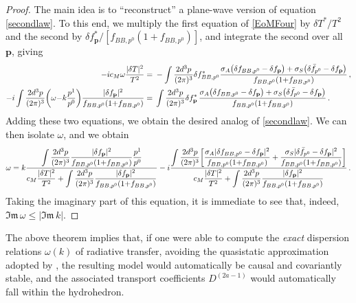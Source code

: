 \documentclass[a4paper, amsfonts, amssymb, amsmath, reprint, showkeys, nofootinbib, twoside,notitlepage,onecolumn]{revtex4-2}
\theoremstyle{definition}
\theoremstyle{theorem}
\theoremstyle{corollary}
\begin{document}
\begin{proof}
The main idea is to ``reconstruct'' a plane-wave version of equation \eqref{secondlaw}. To this end, we multiply the first equation of \eqref{EoMFour} by $\delta T^*/T^2$ and the second by $\delta f_\mathbf{p}^*/[f_{BB,p^0}(1{+}f_{BB,p^0})]$, and integrate the second over all $\mathbf{p}$, giving
\begin{equation}\label{Emu2}
\begin{split}
-i c_M \omega \dfrac{|\delta T|^2}{T^2} ={}& -\int \dfrac{2d^3 p}{(2\pi)^3 } \delta f_{BB,p^0}^* \dfrac{\sigma_A \big(\delta f_{BB,p^0}-\delta f_\mathbf{p}\big)+\sigma_S \big(\delta \Bar{f}_{p^0} -\delta f_\mathbf{p}\big)}{f_{BB,p^0}(1{+}f_{BB,p^0})} \, , \\
-i\int \dfrac{2d^3 p}{(2\pi)^3 }\bigg(\omega {-}k\dfrac{p^1}{p^0} \bigg) \dfrac{|\delta f_\mathbf{p}|^2}{f_{BB,p^0}(1{+}f_{BB,p^0})} ={}& \int \dfrac{2d^3 p}{(2\pi)^3 } \delta f_\mathbf{p}^* \,  \dfrac{ \sigma_A \big(\delta f_{BB,p^0}-\delta f_\mathbf{p}\big)+\sigma_S \big(\delta \Bar{f}_{p^0} -\delta f_\mathbf{p}\big) }{f_{BB,p^0}(1{+}f_{BB,p^0})} \, . \\
\end{split}
\end{equation}
Adding these two equations, we obtain the desired analog of \eqref{secondlaw}. We can then isolate $\omega$, and we obtain
\begin{equation}
\omega =k \dfrac{\displaystyle\int \dfrac{2d^3 p}{(2\pi)^3 }  \dfrac{|\delta f_\mathbf{p}|^2 } {f_{BB,p^0}(1{+}f_{BB,p^0})} \dfrac{p^1}{p^0}}{c_M \dfrac{|\delta T|^2}{T^2} + \displaystyle\int \dfrac{2d^3 p}{(2\pi)^3 }  \dfrac{|\delta f_\mathbf{p}|^2 }{f_{BB,p^0}(1{+}f_{BB,p^0})}} -i \dfrac{\displaystyle\int \dfrac{2d^3p}{(2\pi)^3} \bigg[ \dfrac{\sigma_A|\delta f_{BB,p^0}-\delta f_\mathbf{p}|^2}{f_{BB,p^0}(1{+}f_{BB,p^0})} +\dfrac{\sigma_S |\delta \Bar{f}_{p^0} -\delta f_\mathbf{p}|^2}{f_{BB,p^0}(1{+}f_{BB,p^0})}\bigg]}{c_M \dfrac{|\delta T|^2}{T^2} + \displaystyle\int \dfrac{2d^3 p}{(2\pi)^3 }  \dfrac{|\delta f_\mathbf{p}|^2 }{f_{BB,p^0}(1{+}f_{BB,p^0})}} \, .
\end{equation}
Taking the imaginary part of this equation, it is immediate to see that, indeed, $\mathfrak{Im}\,\omega\leq |\mathfrak{Im} \, k|$.
\end{proof}
The above theorem implies that, if one were able to compute the \textit{exact} dispersion relations $\omega(k)$ of radiative transfer, avoiding the quasistatic approximation adopted by \citet{Spiegel1957}, the resulting model would automatically be causal and covariantly stable, and the associated transport coefficients $D^{(2a-1)}$ would automatically fall within the hydrohedron. 
\end{document}
